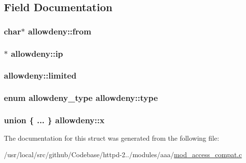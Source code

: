 \subsection{Field Documentation}
\subsubsection[{\texorpdfstring{from}{from}}]{\setlength{\rightskip}{0pt plus 5cm}char$\ast$ allowdeny\+::from}\hypertarget{structallowdeny_a099624af215178aa19faa842d24d7e9e}{}\label{structallowdeny_a099624af215178aa19faa842d24d7e9e}
\subsubsection[{\texorpdfstring{ip}{ip}}]{$\ast$ allowdeny\+::ip}\hypertarget{structallowdeny_a799bf95af08633490efe4951bd06def8}{}\label{structallowdeny_a799bf95af08633490efe4951bd06def8}
\subsubsection[{\texorpdfstring{limited}{limited}}]{ allowdeny\+::limited}\hypertarget{structallowdeny_a75cb207dd4fae5b89c3151d8d4854648}{}\label{structallowdeny_a75cb207dd4fae5b89c3151d8d4854648}
\subsubsection[{\texorpdfstring{type}{type}}]{\setlength{\rightskip}{0pt plus 5cm}enum {\bf allowdeny\+\_\+type} allowdeny\+::type}\hypertarget{structallowdeny_a7e46379af107dfe29b97664949271083}{}\label{structallowdeny_a7e46379af107dfe29b97664949271083}
\subsubsection[{\texorpdfstring{x}{x}}]{\setlength{\rightskip}{0pt plus 5cm}union \{ ... \}   allowdeny\+::x}\hypertarget{structallowdeny_a59a9e8f859af9f3801500f6670c627e0}{}\label{structallowdeny_a59a9e8f859af9f3801500f6670c627e0}


The documentation for this struct was generated from the following file\+:\begin{DoxyCompactItemize}
\item 
/usr/local/src/github/\+Codebase/httpd-\/2../modules/aaa/\hyperlink{mod__access__compat_8c}{mod\+\_\+access\+\_\+compat.\+c}\end{DoxyCompactItemize}
